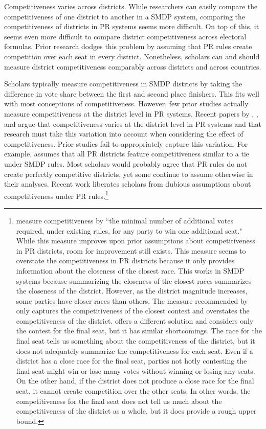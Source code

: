 \documentclass[12pt]{article}
\begin{document}
Competitiveness varies across districts. While researchers can easily compare the competitiveness of one district to another in a SMDP system, comparing the competitiveness of districts in PR systems seems more difficult. On top of this, it seems even more difficult to compare district competitiveness across electoral formulas. Prior research dodges this problem by assuming that PR rules create competition over each seat in every district. Nonetheless, scholars can and should measure district competitiveness comparably across districts and across countries.

Scholars typically measure competitiveness in SMDP districts by taking the difference in vote share between the first and second place finishers. This fits well with most conceptions of competitiveness. However, few prior studies actually measure competitiveness at the district level in PR systems. Recent papers by \cite{BlaisLago2009}, \cite{GrofmanSelb2009}, and \cite{Selb2009} argue that competitiveness varies at the district level in PR systems and that research must take this variation into account when considering the effect of competitiveness. Prior studies fail to appropriately capture this variation. For example, \cite{Franklin2004} assumes that all PR districts feature competitiveness similar to a tie under SMDP rules. Most scholars would probably agree that PR rules do not create perfectly competitive districts, yet some continue to assume otherwise in their analyses. Recent work liberates scholars from dubious assumptions about competitiveness under PR rules.\footnote{\cite{BlaisLago2009} measure competitiveness by ``the minimal number of additional votes required, under existing rules, for any party to win one additional seat." While this measure improves upon prior assumptions about competitiveness in PR districts, room for improvement still exists. This measure seems to overstate the competitiveness in PR districts because it only provides information about the closeness of the closest race. This works in SMDP systems because summarizing the closeness of the closest races summarizes the closeness of the district. However, as the district magnitude increases, some parties have closer races than others. The measure recommended by \cite{BlaisLago2009} only captures the competitiveness of the closest contest and overstates the competitiveness of the district. \cite{Selb2009} offers a different solution and considers only the contest for the final seat, but it has similar shortcomings. The race for the final seat tells us something about the competitiveness of the district, but it does not adequately summarize the competitiveness for each seat. Even if a district has a close race for the final seat, parties not hotly contesting the final seat might win or lose many votes without winning or losing any seats. On the other hand, if the district does not produce a close race for the final seat, it cannot create competition over the other seats. In other words, the competitiveness for the final seat does not tell us much about the competitiveness of the district as a whole, but it does provide a rough upper bound.}
\end{document}
